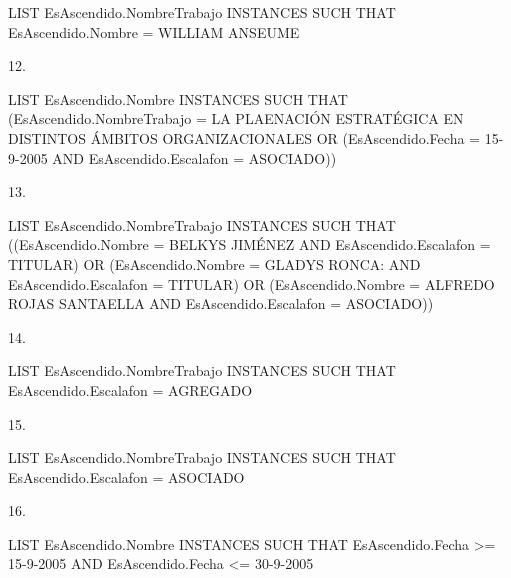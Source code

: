 LIST EsAscendido.NombreTrabajo INSTANCES SUCH THAT 
EsAscendido.Nombre = WILLIAM ANSEUME

12.

LIST EsAscendido.Nombre INSTANCES SUCH THAT 
(EsAscendido.NombreTrabajo = LA PLAENACIÓN ESTRATÉGICA EN DISTINTOS ÁMBITOS ORGANIZACIONALES OR 
(EsAscendido.Fecha = 15-9-2005 AND EsAscendido.Escalafon = ASOCIADO))

13.

LIST EsAscendido.NombreTrabajo INSTANCES SUCH THAT 
((EsAscendido.Nombre = BELKYS JIMÉNEZ AND EsAscendido.Escalafon = TITULAR) OR (EsAscendido.Nombre = GLADYS RONCA:  AND EsAscendido.Escalafon = TITULAR) OR (EsAscendido.Nombre = ALFREDO ROJAS SANTAELLA AND EsAscendido.Escalafon = ASOCIADO))

14.

LIST EsAscendido.NombreTrabajo INSTANCES SUCH THAT 
EsAscendido.Escalafon = AGREGADO

15.

LIST EsAscendido.NombreTrabajo INSTANCES SUCH THAT 
EsAscendido.Escalafon = ASOCIADO

16. 

LIST EsAscendido.Nombre INSTANCES SUCH THAT 
EsAscendido.Fecha >= 15-9-2005 AND EsAscendido.Fecha <= 30-9-2005
